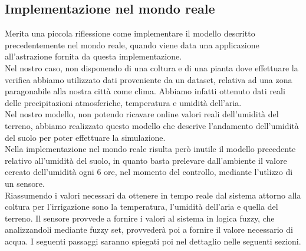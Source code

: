 \documentclass[conference,10pt]{IEEEtran}
\begin{document}
\subsection{Implementazione nel mondo reale}\label{sec:symo}
Merita una piccola riflessione come implementare il modello descritto precedentemente nel mondo reale, quando viene data una applicazione all'astrazione fornita da questa implementazione.\\
Nel nostro caso, non disponendo di una coltura e di una pianta dove effettuare la verifica abbiamo utilizzato dati proveniente da un dataset, relativa ad una zona paragonabile alla nostra città come clima. Abbiamo infatti ottenuto dati reali delle precipitazioni atmosferiche, temperatura e umidità dell'aria.\\
Nel nostro modello, non potendo ricavare online valori reali dell'umidità del terreno, abbiamo realizzato questo modello che descrive l'andamento dell'umidità del suolo per poter effettuare la simulazione.\\
Nella implementazione nel mondo reale risulta però inutile il modello precedente relativo all'umidità del suolo, in quanto basta prelevare dall'ambiente il valore cercato dell'umidità ogni 6 ore, nel momento del controllo, mediante l'utlizzo di un sensore.\\
Riassumendo i valori necessari da ottenere in tempo reale dal sistema attorno alla coltura per l'irrigazione sono la temperatura, l'umidità dell'aria e quella del terreno.
Il sensore provvede a fornire i valori al sistema in logica fuzzy, che analizzandoli mediante fuzzy set, provvederà poi a fornire il valore necessario di acqua. I seguenti passaggi saranno spiegati poi nel dettaglio nelle seguenti sezioni.


\end{document}
